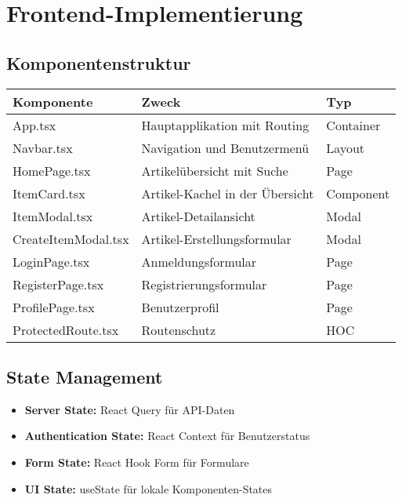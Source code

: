 \documentclass[a4paper,12pt]{article}
\begin{document}
\section{Frontend-Implementierung}

\subsection{Komponentenstruktur}
\begin{longtable}{|p{}|p{}|p{}|}
\hline
\textbf{Komponente} & \textbf{Zweck} & \textbf{Typ} \\
\hline
App.tsx & Hauptapplikation mit Routing & Container \\
\hline
Navbar.tsx & Navigation und Benutzermenü & Layout \\
\hline
HomePage.tsx & Artikelübersicht mit Suche & Page \\
\hline
ItemCard.tsx & Artikel-Kachel in der Übersicht & Component \\
\hline
ItemModal.tsx & Artikel-Detailansicht & Modal \\
\hline
CreateItemModal.tsx & Artikel-Erstellungsformular & Modal \\
\hline
LoginPage.tsx & Anmeldungsformular & Page \\
\hline
RegisterPage.tsx & Registrierungsformular & Page \\
\hline
ProfilePage.tsx & Benutzerprofil & Page \\
\hline
ProtectedRoute.tsx & Routenschutz & HOC \\
\hline
\end{longtable}

\subsection{State Management}
\begin{itemize}
    \item \textbf{Server State:} React Query für API-Daten
    \item \textbf{Authentication State:} React Context für Benutzerstatus
    \item \textbf{Form State:} React Hook Form für Formulare
    \item \textbf{UI State:} useState für lokale Komponenten-States
\end{itemize}
\end{document}
